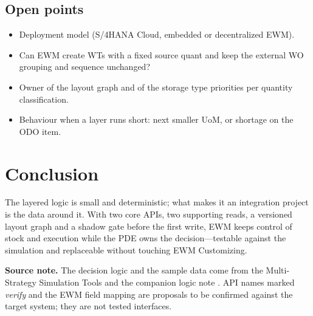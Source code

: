\documentclass[11pt,a4paper]{article}
\begin{document}
\subsection{Open points}
\begin{itemize}[leftmargin=*,itemsep=2pt]
  \item Deployment model (S/4HANA Cloud, embedded or decentralized EWM).
  \item Can EWM create WTs with a fixed source quant and keep the external WO grouping and sequence unchanged?
  \item Owner of the layout graph and of the storage type priorities per quantity classification.
  \item Behaviour when a layer runs short: next smaller UoM, or shortage on the ODO item.
\end{itemize}

\section{Conclusion}
The layered logic is small and deterministic; what makes it an integration project is the data around it. With two core APIs,
two supporting reads, a versioned layout graph and a shadow gate before the first write, EWM keeps control of stock and execution
while the PDE owns the decision---testable against the simulation and replaceable without touching EWM Customizing.

\vspace{4mm}
\noindent\textbf{Source note.} The decision logic and the sample data come from the Multi-Strategy Simulation Tools and the companion
logic note \cite{sim}. API names marked \textit{verify} and the EWM field mapping are proposals to be confirmed against the target
system; they are not tested interfaces.
\end{document}
